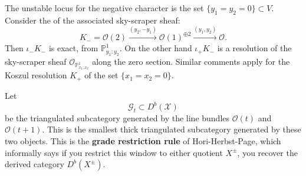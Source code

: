 \documentclass[12pt]{article}
\begin{document}
The unstable locus for the negative character is the set
$\{y_1 = y_2 = 0\} \subset V$. Consider the  of the associated sky-scraper sheaf:
\[
  K_{-} = \mathcal{O}(2) \xrightarrow{(y_2,-y_1)} \mathcal{O}(1)^{\oplus 2}
  \xrightarrow{(y_1,y_2)} \mathcal{O}.
\]
Then $\iota_{-}K_{-}$ is exact,  from
$\mathbb{P}^1_{y_1:y_2}$. On the other hand $\iota_{+}K_{-}$ is a resolution of the sky-scraper
sheaf $\mathcal{O}_{\mathbb{P}^1_{x_1:x_2}}$ along the zero section. Similar comments apply for
the Koszul resolution $K_{+}$ of the set $\{x_1 = x_2 = 0\}$.

Let
\[
  \mathcal{G}_t \subset D^b(\mathcal{X})
\]
be the triangulated subcategory generated by the line bundles
$\mathcal{O}(t)$ and $\mathcal{O}(t+1)$. This is the smallest thick triangulated subcategory generated by these two objects. This is the \textbf{grade restriction rule} of Hori-Herbst-Page, which informally says if you restrict this window to either quotient $X^\pm$, you recover the derived category $D^b(X^\pm)$.
\end{document}
